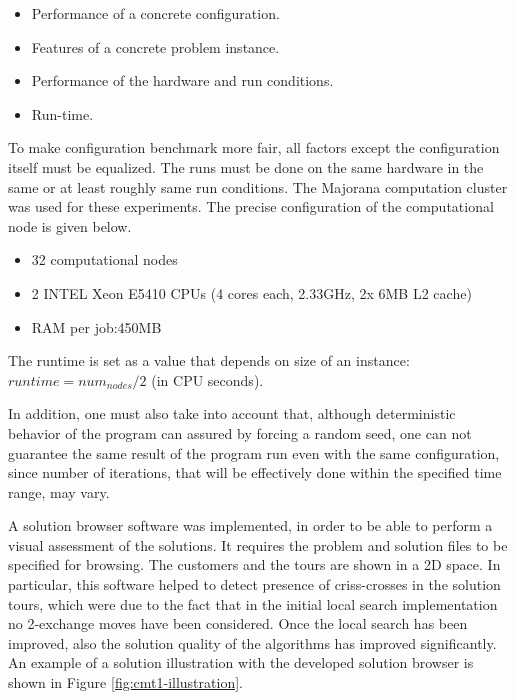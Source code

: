\documentclass[12pt,a4paper,oneside]{book}
\begin{document}
\begin{itemize}
\item Performance of a concrete configuration.
\item Features of a concrete problem instance.
\item Performance of the hardware and run conditions.
\item Run-time.
\end{itemize}

To make configuration benchmark more fair, all factors except the configuration itself must be equalized. The runs must be done on the same hardware in the same or at least roughly same run conditions. The Majorana computation cluster was used for these experiments. The precise configuration of the computational node is given below.
\begin{itemize}
\item 32 computational nodes
\item 2 INTEL Xeon E5410 CPUs (4 cores each, 2.33GHz, 2x 6MB L2 cache)
\item RAM per job:450MB
\end{itemize}

The runtime is set as a value that depends on size of an instance: $runtime = num_{nodes} / 2$ (in CPU seconds).

In addition, one must also take into account that, although deterministic behavior of the program can assured by forcing a random seed, one can not guarantee the same result of the program run even with the same configuration, since number of iterations, that will be effectively done within the specified time range, may vary.

A solution browser software was implemented, in order to be able to perform a visual assessment of the solutions. It requires the problem and solution files to be specified for browsing. The customers and the tours are shown in a 2D space. In particular, this software helped to detect presence of criss-crosses in the solution tours, which were due to the fact that in the initial local search implementation no 2-exchange moves have been considered. Once the local search has been improved, also the solution quality of the algorithms has improved significantly.  An example of a solution illustration with the developed solution browser is shown in Figure \ref{fig:cmt1-illustration}.
\end{document}
